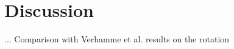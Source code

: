 \documentclass[usenatbib]{mn2e}
\begin{document}





\section{Discussion}
\label{sec:discussion}

... Comparison with Verhamme et al. results on the rotation
\end{document}
